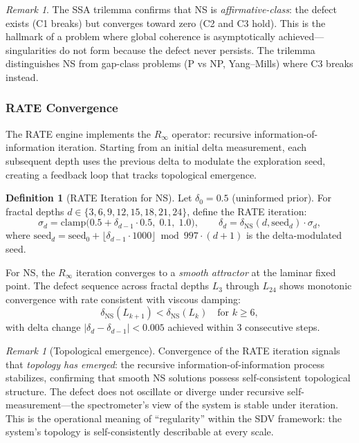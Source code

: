 \documentclass[11pt]{article}
\theoremstyle{definition}
\newtheorem{definition}[theorem]{Definition}
\theoremstyle{remark}
\newtheorem{remark}[theorem]{Remark}
\begin{document}
\begin{remark}
The SSA trilemma confirms that NS is \emph{affirmative-class}: the defect exists
(C1 breaks) but converges toward zero (C2 and C3 hold).  This is the hallmark
of a problem where global coherence is asymptotically achieved---singularities
do not form because the defect never persists.  The trilemma distinguishes NS
from gap-class problems (P vs NP, Yang--Mills) where C3 breaks instead.
\end{remark}

\subsubsection{RATE Convergence}
\label{sec:rate-ns}

The RATE engine implements the $R_\infty$ operator: recursive
information-of-information iteration.  Starting from an initial delta
measurement, each subsequent depth uses the previous delta to modulate the
exploration seed, creating a feedback loop that tracks topological emergence.

\begin{definition}[RATE Iteration for NS]
\label{def:rate-ns}
Let $\delta_0 = 0.5$ (uninformed prior).  For fractal depths
$d \in \{3, 6, 9, 12, 15, 18, 21, 24\}$, define the RATE iteration:
\begin{equation}\label{eq:rate-iteration}
  \sigma_d = \mathrm{clamp}\bigl(0.5 + \delta_{d-1} \cdot 0.5,\; 0.1,\; 1.0\bigr),
  \qquad
  \delta_d = \delta_{\mathrm{NS}}(d, \mathrm{seed}_d) \cdot \sigma_d,
\end{equation}
where $\mathrm{seed}_d = \mathrm{seed}_0 + \lfloor \delta_{d-1} \cdot 1000 \rfloor
\bmod 997 \cdot (d+1)$ is the delta-modulated seed.
\end{definition}

For NS, the $R_\infty$ iteration converges to a \emph{smooth attractor} at the
laminar fixed point.  The defect sequence across fractal depths $L_3$ through
$L_{24}$ shows monotonic convergence with rate consistent with viscous damping:
\begin{equation}\label{eq:rate-convergence}
  \delta_{\mathrm{NS}}(L_{k+1}) < \delta_{\mathrm{NS}}(L_k)
  \quad \text{for } k \geq 6,
\end{equation}
with delta change $|\delta_d - \delta_{d-1}| < 0.005$ achieved within 3
consecutive steps.

\begin{remark}[Topological emergence]
Convergence of the RATE iteration signals that \emph{topology has emerged}:
the recursive information-of-information process stabilizes, confirming that
smooth NS solutions possess self-consistent topological structure.  The defect
does not oscillate or diverge under recursive self-measurement---the spectrometer's
view of the system is stable under iteration.  This is the operational meaning of
``regularity'' within the SDV framework: the system's topology is self-consistently
describable at every scale.
\end{remark}
\end{document}

